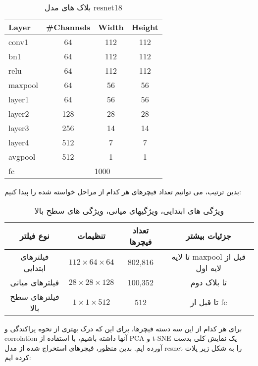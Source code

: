 \documentclass[a4paper,12pt]{article}
\begin{document}
	
\begin{table}[h]
	\centering
	\begin{latin}
	\begin{tabular}{|l|c|c|c|}
		\hline
		\textbf{Layer} & \textbf{\#Channels} & \textbf{Width} & \textbf{Height} \\
		\hline
		conv1 & 64 & 112 & 112 \\
		\hline
		bn1 & 64 & 112 & 112 \\
		\hline
		relu & 64 & 112 & 112 \\
		\hline
		maxpool & 64 & 56 & 56 \\
		\hline
		layer1 & 64 & 56 & 56 \\
		\hline
		layer2 & 128 & 28 & 28 \\
		\hline
		layer3 & 256 & 14 & 14 \\
		\hline
		layer4 & 512 & 7 & 7 \\
		\hline
		avgpool & 512 & 1 & 1 \\
		\hline
		fc & \multicolumn{3}{c|}{1000} \\
		\hline
	\end{tabular}
	\end{latin}	
	\caption{بلاک های مدل resnet18}
	\label{tab:resnet18}
\end{table}
%
%
%
%
%
%
بدین ترتیب، می ‌توانیم تعداد فیچرهای هر کدام از مراحل خواسته شده را پیدا کنیم: 
\begin{table}[h]
	\centering
	\begin{tabular}{|c|c|c|c|}
		\hline
		\textbf{نوع فیلتر} & \textbf{تنظیمات} & \textbf{تعداد فیچرها} & \textbf{جزئیات بیشتر} \\
		\hline
		فیلترهای ابتدایی 
		&  $112 \times 64 \times 64$ & 802,816 & 
		تا لایه maxpool قبل از لایه اول 
		\\
		\hline
		فیلترهای میانی
		 & $28  \times 28 \times 128$ & 100,352 & 
		 تا بلاک دوم \\
		\hline
		فیلترهای سطح بالا &  $1 \times 1 \times 512$ & 512 & تا قبل از fc \\
		\hline
	\end{tabular}
	\caption{ویژگی های ابتدایی، ویژگیهای میانی، ویژگی های سطح بالا}
\end{table}
	

\pagebreak
برای هر کدام از این سه دسته فیچرها، برای این که درک بهتری از نحوه پراکندگی و corrolation آنها داشته باشیم، با استفاده از PCA و t-SNE یک نمایش کلی بدست آورده ایم. بدین منظور، فیچرهای استخراج شده از مدل resnet را به شکل زیر پلات کرده ایم:
\end{document}

